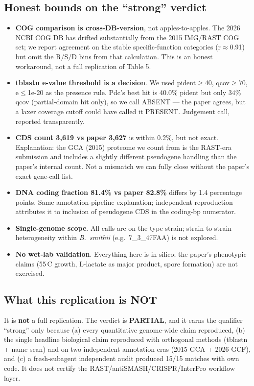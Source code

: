 \documentclass[11pt]{article}
\begin{document}
\subsection{Honest bounds on the ``strong'' verdict}
\begin{itemize}
  \item \textbf{COG comparison is cross-DB-version}, not apples-to-apples. The 2026 NCBI COG DB has drifted substantially from the 2015 IMG/RAST COG set; we report agreement on the stable specific-function categories (r$\approx$0.91) but omit the R/S/D bins from that calculation. This is an honest workaround, not a full replication of Table 5.
  \item \textbf{tblastn e-value threshold is a decision}. We used pident$\geq$40, qcov$\geq$70, e$\leq$1e-20 as the presence rule. Pdc's best hit is 40.0\% pident but only 34\% qcov (partial-domain hit only), so we call ABSENT --- the paper agrees, but a laxer coverage cutoff could have called it PRESENT. Judgement call, reported transparently.
  \item \textbf{CDS count 3{,}619 vs paper 3{,}627} is within 0.2\%, but not exact. Explanation: the GCA (2015) proteome we count from is the RAST-era submission and includes a slightly different pseudogene handling than the paper's internal count. Not a mismatch we can fully close without the paper's exact gene-call list.
  \item \textbf{DNA coding fraction 81.4\% vs paper 82.8\%} differs by 1.4 percentage points. Same annotation-pipeline explanation; independent reproduction attributes it to inclusion of pseudogene CDS in the coding-bp numerator.
  \item \textbf{Single-genome scope}. All calls are on the type strain; strain-to-strain heterogeneity within \textit{B.\ smithii} (e.g.\ 7\_3\_47FAA) is not explored.
  \item \textbf{No wet-lab validation}. Everything here is in-silico; the paper's phenotypic claims (55\,\textdegree{}C growth, L-lactate as major product, spore formation) are not exercised.
\end{itemize}

\subsection{What this replication is NOT}
It is \textbf{not} a full replication. The verdict is \textbf{PARTIAL}, and it earns the qualifier ``strong'' only because (a) every quantitative genome-wide claim reproduced, (b) the single headline biological claim reproduced with orthogonal methods (tblastn + name-scan) and on two independent annotation eras (2015 GCA + 2026 GCF), and (c) a fresh-subagent independent audit produced 15/15 matches with own code. It does not certify the RAST/antiSMASH/CRISPR/InterPro workflow layer.
\end{document}
